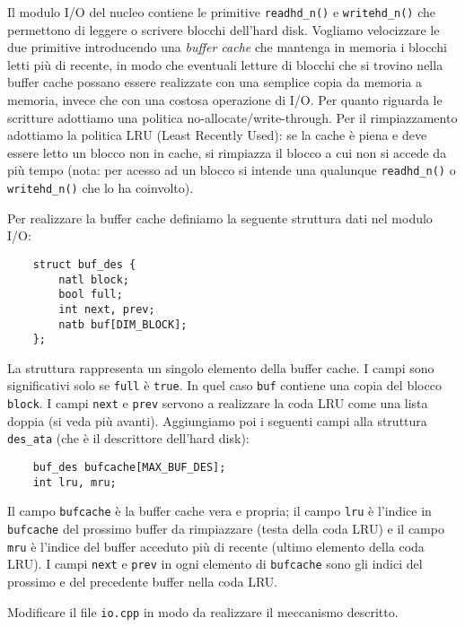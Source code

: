 Il modulo I/O del nucleo contiene le primitive \texttt{readhd\_n()} e \texttt{writehd\_n()} che
permettono di leggere o scrivere blocchi dell'hard disk. Vogliamo velocizzare le due primitive
introducendo una {\em buffer cache} che mantenga in memoria i blocchi letti pi\`u di recente,
in modo che eventuali letture di blocchi che si trovino nella buffer cache possano essere realizzate
con una semplice copia da memoria a memoria, invece che con una costosa operazione di I/O.
Per quanto riguarda le scritture adottiamo una politica no-allocate/write-through. Per il rimpiazzamento
adottiamo la politica LRU (Least Recently Used): se la cache \`e piena e deve essere letto un blocco
non in cache, si rimpiazza il blocco a cui non si accede da pi\`u tempo (nota: per acesso ad un blocco
si intende una qualunque \texttt{readhd\_n()} o \texttt{writehd\_n()} che lo ha coinvolto).

Per realizzare la buffer cache definiamo la seguente struttura dati nel modulo I/O:
\begin{verbatim}
    struct buf_des {
        natl block;
        bool full;
        int next, prev;
        natb buf[DIM_BLOCK];
    };
\end{verbatim}
La struttura rappresenta un singolo elemento della buffer cache. I campi sono significativi solo
se \texttt{full} \`e \texttt{true}. In quel caso \texttt{buf} contiene una copia del blocco \texttt{block}.
I campi \texttt{next} e \texttt{prev} servono a realizzare la coda LRU come una lista doppia (si veda pi\`u avanti).
Aggiungiamo poi i seguenti campi alla struttura \texttt{des\_ata} (che \`e il descrittore dell'hard disk):
\begin{verbatim}
    buf_des bufcache[MAX_BUF_DES];
    int lru, mru;
\end{verbatim}
Il campo \texttt{bufcache} \`e la buffer cache vera e propria; il campo \texttt{lru} \`e l'indice in \texttt{bufcache}
del prossimo buffer da rimpiazzare (testa della coda LRU) e il campo \texttt{mru} \`e l'indice del buffer acceduto pi\`u di recente (ultimo elemento della coda LRU).
I campi \texttt{next} e \texttt{prev} in ogni elemento di \texttt{bufcache} sono gli indici del prossimo e del precedente buffer nella coda LRU.

Modificare il file \verb|io.cpp| in modo da realizzare il meccanismo descritto.
